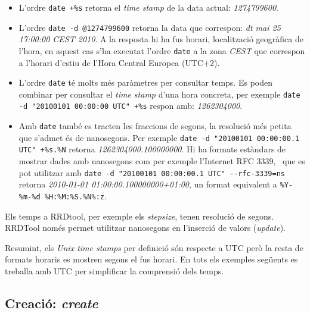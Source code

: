 \begin{itemize}
\item L'ordre \verb.date +%s. retorna el \emph{time stamp} de la data actual: \emph{1274799600}.

\item L'ordre \verb+date -d @1274799600+ retorna la data que correspon: \emph{dt mai 25 17:00:00 CEST 2010}. A la resposta hi ha fus horari, localització geogràfica de l'hora, en aquest cas s'ha executat l'ordre \verb+date+ a la zona \emph{CEST} que correspon a l'horari d'estiu de l'Hora Central Europea (UTC+2).

\item L'ordre \verb+date+ té molts més paràmetres per consultar temps. Es poden combinar per consultar el \emph{time stamp} d'una hora concreta, per exemple \lstinline[style=sh].date -d "20100101 00:00:00 UTC" +%s. respon amb: \emph{1262304000}. 

\item Amb \verb+date+ també es tracten les fraccions de segons, la resolució més petita que s'admet és de nanosegons. 
Per exemple \lstinline[style=sh][date -d "20100101 00:00:00.1 UTC" +%
retorna  \emph{1262304000.100000000}. Hi ha formats estàndars de mostrar dades amb nanosegons com per exemple l'Internet RFC 3339,~\cite{rfc3339} que es pot utilitzar amb \lstinline[style=sh][date -d "20100101 00:00:00.1 UTC" --rfc-3339=ns[ retorna  \emph{2010-01-01 01:00:00.100000000+01:00}, un format equivalent a \verb[%Y-%m-%d %H:%M:%S.%N%:z[.
\end{itemize}


Els temps a RRDtool, per exemple els \emph{stepsize}, tenen resolució de segons.
RRDTool només permet utilitzar nanosegons en l'inserció de valors (\emph{update}).


Resumint, els \emph{Unix time stamps} per definició són respecte a UTC però la resta de formats horaris es mostren segons el fus horari. En tots els exemples següents es treballa amb UTC per simplificar la comprensió dels temps.




\subsection{Creació: \emph{create}}\label{RRDcreate}

